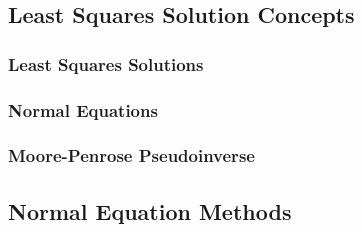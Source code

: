 \documentclass[12pt]{article}
\begin{document}
\subsection{Least Squares Solution Concepts}
\subsubsection{Least Squares Solutions}
\subsubsection{Normal Equations}
\subsubsection{Moore-Penrose Pseudoinverse}
\subsection{Normal Equation Methods}
\end{document}
